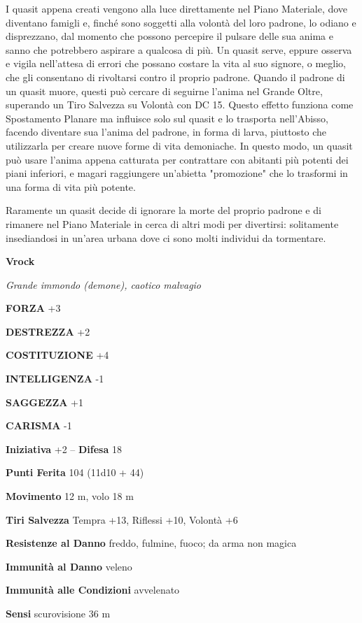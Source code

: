 \begin{multicols}{2}
I quasit appena creati vengono alla luce direttamente nel Piano Materiale, dove diventano famigli e, finché sono soggetti alla volontà del loro padrone, lo odiano e disprezzano, dal momento che possono percepire il pulsare delle sua anima e sanno che potrebbero aspirare a qualcosa di più. Un quasit serve, eppure osserva e vigila nell'attesa di errori che possano costare la vita al suo signore, o meglio, che gli consentano di rivoltarsi contro il proprio padrone. Quando il padrone di un quasit muore, questi può cercare di seguirne l'anima nel Grande Oltre, superando un Tiro Salvezza su Volontà con DC 15. Questo effetto funziona come Spostamento Planare ma influisce solo sul quasit e lo trasporta nell'Abisso, facendo diventare sua l'anima del padrone, in forma di larva, piuttosto che utilizzarla per creare nuove forme di vita demoniache. In questo modo, un quasit può usare l'anima appena catturata per contrattare con abitanti più potenti dei piani inferiori, e magari raggiungere un'abietta "promozione" che lo trasformi in una forma di vita più potente.

Raramente un quasit decide di ignorare la morte del proprio padrone e di rimanere nel Piano Materiale in cerca di altri modi per divertirsi: solitamente insediandosi in un'area urbana dove ci sono molti individui da tormentare.

\medskip{}\textbf{Vrock}

\textit{Grande immondo (demone), caotico malvagio}

\textbf{FORZA} +3

\textbf{DESTREZZA} +2

\textbf{COSTITUZIONE} +4

\textbf{INTELLIGENZA} -1

\textbf{SAGGEZZA} +1

\textbf{CARISMA} -1

\textbf{Iniziativa} +2 -- \textbf{Difesa} 18

\textbf{Punti Ferita} 104 (11d10 + 44)

\textbf{Movimento} 12 m, volo 18 m

\textbf{Tiri Salvezza} Tempra +13, Riflessi +10, Volontà +6

\textbf{Resistenze al Danno} freddo, fulmine, fuoco; da arma non magica

\textbf{Immunità al Danno} veleno

\textbf{Immunità alle Condizioni} avvelenato

\textbf{Sensi} scurovisione 36 m


\end{multicols}
